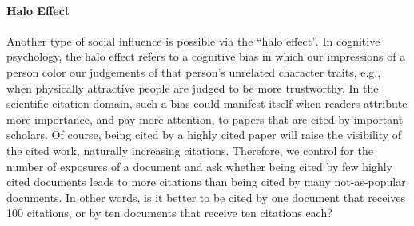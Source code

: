 \documentclass[10pt]{bmc_article}
\newenvironment{bmcformat}{\baselineskip20pt\sloppy\setboolean{publ}{false}}{\baselineskip20pt\sloppy}
\begin{document}
\begin{bmcformat}
\paragraph{Halo Effect}
Another type of social influence is possible via the ``halo effect''. In cognitive psychology, the halo effect refers to a cognitive bias in which our impressions of a person color our judgements of that person's unrelated character traits, e.g., when physically attractive people are judged to be more trustworthy. In the scientific citation domain, such a bias could manifest itself when readers attribute more importance, and pay more attention, to papers that are cited by important scholars.
Of course, being cited by a highly cited paper will raise the visibility of the cited work, naturally increasing citations. Therefore, we control for the number of exposures of a document and ask whether being cited by few highly cited documents leads to more citations than being cited by many not-as-popular documents.
In other words, is it better to be cited  by one document that receives 100 citations, or by ten documents that receive ten citations each?




\end{bmcformat}
\end{document}
